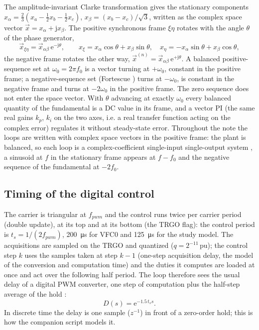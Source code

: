\documentclass[10pt,a4paper]{scrartcl}
\newcommand{\ts}{t_s}
\newcommand{\wo}{\omega_0}
\newcommand{\jj}{\mathrm{j}}
\newcommand{\ee}{\mathrm{e}}
\newcommand{\pu}{\,\mathrm{pu}}
\begin{document}
\begin{onehalfspace}
The amplitude-invariant Clarke transformation gives the stationary components $x_\alpha = \tfrac23(x_a - \tfrac12 x_b - \tfrac12 x_c)$, $x_\beta = (x_b - x_c)/\sqrt3$, written as the complex space vector $\vec x = x_\alpha + \jj x_\beta$. The positive synchronous frame $\xi\eta$ rotates with the angle $\theta$ of the phase generator,
\begin{equation}
\vec x_{\xi\eta} = \vec x_{\alpha\beta}\,\ee^{-\jj\theta}, \qquad
x_\xi = x_\alpha\cos\theta + x_\beta\sin\theta, \quad x_\eta = -x_\alpha\sin\theta + x_\beta\cos\theta,
\label{eq:posframe}
\end{equation}
the negative frame rotates the other way, $\vec x^{(n)} = \vec x_{\alpha\beta}\,\ee^{+\jj\theta}$. A balanced positive-sequence set at $\wo = 2\pi f_0$ is a vector turning at $+\wo$, constant in the positive frame; a negative-sequence set (Fortescue \cite{fortescue1918}) turns at $-\wo$, is constant in the negative frame and turns at $-2\wo$ in the positive frame. The zero sequence does not enter the space vector. With $\theta$ advancing at exactly $\wo$ every balanced quantity of the fundamental is a DC value in its frame, and a vector PI (the same real gains $k_p$, $k_i$ on the two axes, i.e. a real transfer function acting on the complex error) regulates it without steady-state error. Throughout the note the loops are written with complex space vectors in the positive frame: the plant is balanced, so each loop is a complex-coefficient single-input single-output system \cite{harnefors2007}, a sinusoid at $f$ in the stationary frame appears at $f - f_0$ and the negative sequence of the fundamental at $-2f_0$.

\subsection{Timing of the digital control}
\label{sec:timing}

The carrier is triangular at $f_{pwm}$ and the control runs twice per carrier period (double update), at its top and at its bottom (the TRGO flag): the control period is $\ts = 1/(2f_{pwm})$, \SI{200}{\micro s} for VFC0 and \SI{125}{\micro s} for the study model. The acquisitions are sampled on the TRGO and quantized ($q = 2^{-11}\pu$); the control step $k$ uses the samples taken at step $k-1$ (one-step acquisition delay, the model of the conversion and computation time) and the duties it computes are loaded at once and act over the following half period. The loop therefore sees the usual delay of a digital PWM converter, one step of computation plus the half-step average of the hold \cite{buso2015}:
\begin{equation}
D(s) = \ee^{-1.5\,\ts s}.
\label{eq:delay}
\end{equation}
In discrete time the delay is one sample ($z^{-1}$) in front of a zero-order hold; this is how the companion script models it.


\end{onehalfspace}
\end{document}
